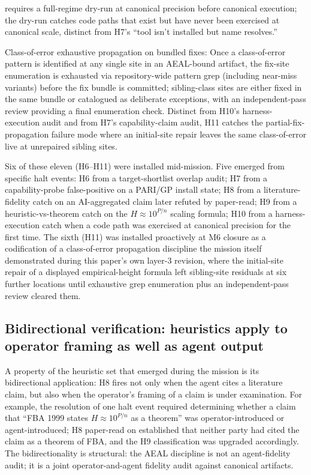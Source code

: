 \documentclass[11pt,a4paper]{article}
\begin{document}
\begin{description}[itemsep=2pt,topsep=2pt]
  requires a full-regime dry-run at canonical precision before canonical
  execution; the dry-run catches code paths that exist but have never been
  exercised at canonical scale, distinct from H7's ``tool isn't installed
  but name resolves.''
\item[H11.] Class-of-error exhaustive propagation on bundled fixes:
  Once a class-of-error pattern is identified at any single site in an
  AEAL-bound artifact, the fix-site enumeration is exhausted via
  repository-wide pattern grep (including near-miss variants) before the
  fix bundle is committed; sibling-class sites are either fixed in the
  same bundle or catalogued as deliberate exceptions, with an
  independent-pass review providing a final enumeration check. Distinct
  from H10's harness-execution audit and from H7's capability-claim
  audit, H11 catches the partial-fix-propagation failure mode where an
  initial-site repair leaves the same class-of-error live at unrepaired
  sibling sites.
\end{description}

Six of these eleven (H6--H11) were installed mid-mission. Five emerged
from specific halt events: H6 from a target-shortlist overlap audit;
H7 from a capability-probe false-positive on a PARI/GP install state;
H8 from a literature-fidelity catch on an AI-aggregated claim later
refuted by paper-read; H9 from a heuristic-vs-theorem catch on the
$H \approx 10^{P/n}$
scaling formula; H10 from a harness-execution catch when a code path
was exercised at canonical precision for the first time. The sixth
(H11) was installed proactively at M6 closure as a codification of a
class-of-error propagation discipline the mission itself demonstrated
during this paper's own layer-3 revision, where the initial-site
repair of a displayed empirical-height formula left sibling-site
residuals at six further locations until exhaustive grep enumeration
plus an independent-pass review cleared them.

\subsection{Bidirectional verification: heuristics apply to operator
   framing as well as agent output}\label{sec:aeal-bidirectional}

A property of the heuristic set that emerged during the mission is its
bidirectional application: H8 fires not only when the agent cites a
literature claim, but also when the operator's framing of a claim is
under examination.
For example, the resolution of one halt event required determining whether
a claim that ``FBA 1999 states $H \approx 10^{P/n}$ as a theorem'' was
operator-introduced or agent-introduced; H8 paper-read on
\cite{fba1999} established that neither party had cited the claim as a
theorem of FBA, and the H9 classification was upgraded accordingly.
The bidirectionality is structural: the AEAL discipline is not an
agent-fidelity audit; it is a joint operator-and-agent fidelity audit
against canonical artifacts.
\end{document}
